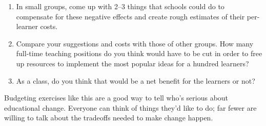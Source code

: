 \begin{enumerate}

\item
  In small groups,
  come up with 2--3 things that schools could do to compensate for these negative effects
  and create rough estimates of their per-learner costs.

\item
  Compare your suggestions and costs with those of other groups.
  How many full-time teaching positions do you think would have to be cut
  in order to free up resources to implement the most popular ideas for a hundred learners?

\item
  As a class,
  do you think that would be a net benefit for the learners or not?

\end{enumerate}

Budgeting exercises like this are a good way to tell who's serious about educational change.
Everyone can think of things they'd like to do;
far fewer are willing to talk about the tradeoffs needed to make change happen.
